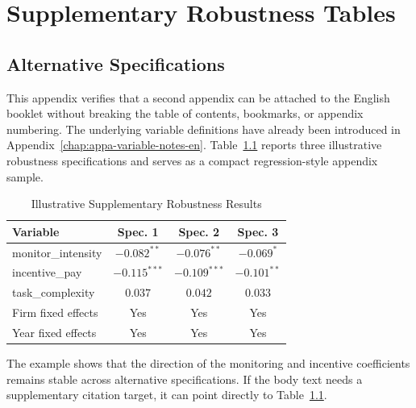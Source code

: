 \chapter{Supplementary Robustness Tables}
\label{chap:appb-robustness-tables-en}

\section{Alternative Specifications}
\label{sec:appb-alternative-specifications-en}

This appendix verifies that a second appendix can be attached to the English booklet without breaking the table of contents, bookmarks, or appendix numbering. The underlying variable definitions have already been introduced in Appendix~\ref{chap:appa-variable-notes-en}. Table~\ref{tab:appb-robustness-en} reports three illustrative robustness specifications and serves as a compact regression-style appendix sample.

\begin{table}[htbp]
    \centering
    \caption{Illustrative Supplementary Robustness Results}
    \label{tab:appb-robustness-en}
    \begin{tabular}{lccc}
        \toprule
        Variable & Spec. 1 & Spec. 2 & Spec. 3 \\
        \midrule
        monitor\_intensity & $-0.082^{**}$ & $-0.076^{**}$ & $-0.069^{*}$ \\
        incentive\_pay & $-0.115^{***}$ & $-0.109^{***}$ & $-0.101^{**}$ \\
        task\_complexity & $0.037$ & $0.042$ & $0.033$ \\
        Firm fixed effects & Yes & Yes & Yes \\
        Year fixed effects & Yes & Yes & Yes \\
        \bottomrule
    \end{tabular}
\end{table}

The example shows that the direction of the monitoring and incentive coefficients remains stable across alternative specifications. If the body text needs a supplementary citation target, it can point directly to Table~\ref{tab:appb-robustness-en}.
